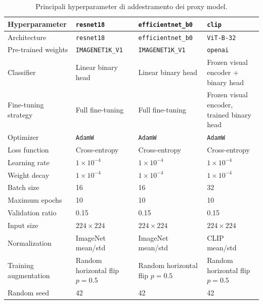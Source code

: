 \begin{table}[H]
\centering
\caption{Principali hyperparameter di addestramento dei proxy model.}
\label{tab:methodology-training-hyperparameters}
\footnotesize
\renewcommand{\arraystretch}{1.15}
\begin{tabularx}{\textwidth}{@{}p{}XXX@{}}
\toprule
\textbf{Hyperparameter} &
\textbf{\texttt{resnet18}} &
\textbf{\texttt{efficientnet\_b0}} &
\textbf{\texttt{clip}} \\
\midrule
Architecture
& \texttt{resnet18}
& \texttt{efficientnet\_b0}
& \texttt{ViT-B-32} \\

Pre-trained weights
& \texttt{IMAGENET1K\_V1}
& \texttt{IMAGENET1K\_V1}
& \texttt{openai} \\

Classifier
& Linear binary head
& Linear binary head
& Frozen visual encoder + binary head \\

Fine-tuning strategy
& Full fine-tuning
& Full fine-tuning
& Frozen visual encoder, trained binary head \\

Optimizer
& \texttt{AdamW}
& \texttt{AdamW}
& \texttt{AdamW} \\

Loss function
& Cross-entropy
& Cross-entropy
& Cross-entropy \\

Learning rate
& \(1 \times 10^{-4}\)
& \(1 \times 10^{-4}\)
& \(1 \times 10^{-4}\) \\

Weight decay
& \(1 \times 10^{-4}\)
& \(1 \times 10^{-4}\)
& \(1 \times 10^{-4}\) \\

Batch size
& 16
& 16
& 32 \\

Maximum epochs
& 10
& 10
& 10 \\

Validation ratio
& 0.15
& 0.15
& 0.15 \\

Input size
& \(224 \times 224\)
& \(224 \times 224\)
& \(224 \times 224\) \\

Normalization
& ImageNet mean/std
& ImageNet mean/std
& CLIP mean/std \\

Training augmentation
& Random horizontal flip \(p=0.5\)
& Random horizontal flip \(p=0.5\)
& Random horizontal flip \(p=0.5\) \\

Random seed
& 42
& 42
& 42 \\
\bottomrule
\end{tabularx}
\end{table}


